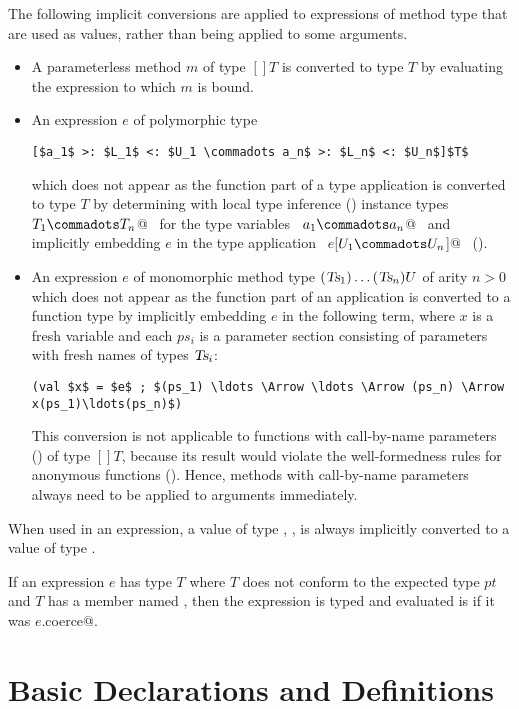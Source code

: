 \documentclass[a4paper,12pt,twoside,titlepage]{book}
\newcommand{\Ts}{\mbox{\sl Ts}}
\begin{document}
The following implicit conversions are applied to expressions of
method type that are used as values, rather than being applied to some
arguments.
\begin{itemize}
\item
A parameterless method $m$ of type $[] T$
is converted to type $T$ by evaluating the expression to which $m$ is bound.
\item
An expression $e$ of polymorphic type 
\begin{lstlisting}
[$a_1$ >: $L_1$ <: $U_1 \commadots a_n$ >: $L_n$ <: $U_n$]$T$
\end{lstlisting}
which does not appear as the function part of
a type application is converted to type $T$
by determining with local type inference
() instance types ~\lstinline@$T_1 \commadots T_n$@~ 
for the type variables ~\lstinline@$a_1 \commadots a_n$@~ and
implicitly embedding $e$ in the type application
~\lstinline@$e$[$U_1 \commadots U_n$]@~ ().
\item
An expression $e$ of monomorphic method type
$(\Ts_1) \ldots (\Ts_n) U$ of arity $n > 0$
which does not appear as the function part of an application is
converted to a function type by implicitly embedding $e$ in
the following term, where $x$ is a fresh variable and each $ps_i$ is a
parameter section consisting of parameters with fresh names of types $\Ts_i$:
\begin{lstlisting}
(val $x$ = $e$ ; $(ps_1) \ldots \Arrow \ldots \Arrow (ps_n) \Arrow x(ps_1)\ldots(ps_n)$)
\end{lstlisting}
This conversion is not applicable to functions with call-by-name
parameters () of type $[]T$, because its result
would violate the well-formedness rules for anonymous functions
(). Hence, methods with call-by-name
parameters always need to be applied to arguments immediately.
\end{itemize}

When used in an expression, a value of type , ,
 is always implicitly converted to a value of type
.

If an expression $e$ has type $T$ where $T$ does not conform to the
expected type $pt$ and $T$ has a member named \lstinline@coerce@, then
the expression is typed and evaluated is if it was
\lstinline@$e$.coerce@.


\chapter{Basic Declarations and Definitions}
\label{sec:defs}
\end{document}
